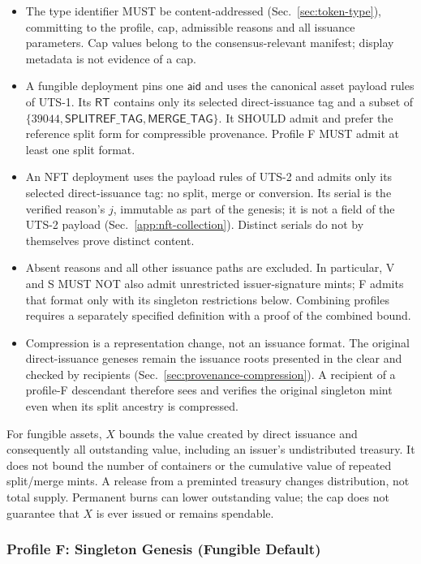 \begin{itemize}
	\item The type identifier MUST be content-addressed (Sec.~\ref{sec:token-type}), committing to the profile, cap, admissible reasons and all issuance parameters. Cap values belong to the consensus-relevant manifest; display metadata is not evidence of a cap.
	\item A fungible deployment pins one $\mathsf{aid}$ and uses the canonical asset payload rules of UTS-1. Its $\mathsf{RT}$ contains only its selected direct-issuance tag and a subset of $\{39044,\mathsf{SPLITREF\_TAG},\mathsf{MERGE\_TAG}\}$. It SHOULD admit and prefer the reference split form for compressible provenance. Profile F MUST admit at least one split format.
	\item An NFT deployment uses the payload rules of UTS-2 and admits only its selected direct-issuance tag: no split, merge or conversion. Its serial is the verified reason's $j$, immutable as part of the genesis; it is not a field of the UTS-2 payload (Sec.~\ref{app:nft-collection}). Distinct serials do not by themselves prove distinct content.
	\item Absent reasons and all other issuance paths are excluded. In particular, V and S MUST NOT also admit unrestricted issuer-signature mints; F admits that format only with its singleton restrictions below. Combining profiles requires a separately specified definition with a proof of the combined bound.
	\item Compression is a representation change, not an issuance format. The original direct-issuance geneses remain the issuance roots presented in the clear and checked by recipients (Sec.~\ref{sec:provenance-compression}). A recipient of a profile-F descendant therefore sees and verifies the original singleton mint even when its split ancestry is compressed.
\end{itemize}

For fungible assets, $X$ bounds the value created by direct issuance and consequently all outstanding value, including an issuer's undistributed treasury. It does not bound the number of containers or the cumulative value of repeated split/merge mints. A release from a preminted treasury changes distribution, not total supply. Permanent burns can lower outstanding value; the cap does not guarantee that $X$ is ever issued or remains spendable.

\subsubsection{Profile F: Singleton Genesis (Fungible Default)}\label{app:uts-singleton}

